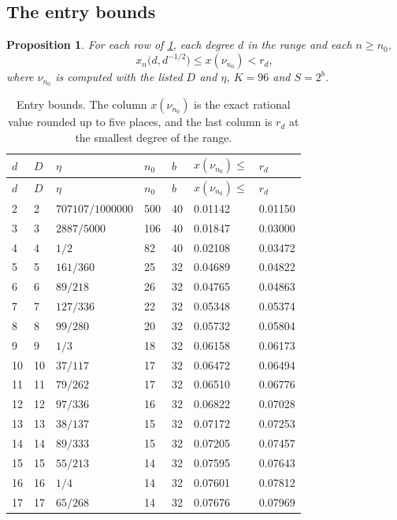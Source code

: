 \documentclass[11pt]{amsart}
\newtheorem{proposition}[theorem]{Proposition}
\theoremstyle{definition}
\theoremstyle{remark}
\begin{document}
\subsection{The entry bounds}

\begin{proposition}\label{prop:entry}
For each row of \cref{tab:entry}, each degree $d$ in the range and each $n\ge n_0$,
\[
x_n\big(d,d^{-1/2}\big)\le x(\nu_{n_0})<r_d,
\]
where $\nu_{n_0}$ is computed with the listed $D$ and $\eta$, $K=96$ and $S=2^b$.
\end{proposition}

{\small
\begin{longtable}{lllllll}
\caption{Entry bounds. The column $x(\nu_{n_0})$ is the exact rational value rounded up to five places, and the
last column is $r_d$ at the smallest degree of the range.}\label{tab:entry}\\
\hline
$d$ & $D$ & $\eta$ & $n_0$ & $b$ & $x(\nu_{n_0})\le$ & $r_d$\\
\hline
\endfirsthead
\hline
$d$ & $D$ & $\eta$ & $n_0$ & $b$ & $x(\nu_{n_0})\le$ & $r_d$\\
\hline
\endhead
2 & 2 & $707107/1000000$ & 500 & 40 & 0.01142 & 0.01150\\
3 & 3 & $2887/5000$ & 106 & 40 & 0.01847 & 0.03000\\
4 & 4 & $1/2$ & 82 & 40 & 0.02108 & 0.03472\\
5 & 5 & $161/360$ & 25 & 32 & 0.04689 & 0.04822\\
6 & 6 & $89/218$ & 26 & 32 & 0.04765 & 0.04863\\
7 & 7 & $127/336$ & 22 & 32 & 0.05348 & 0.05374\\
8 & 8 & $99/280$ & 20 & 32 & 0.05732 & 0.05804\\
9 & 9 & $1/3$ & 18 & 32 & 0.06158 & 0.06173\\
10 & 10 & $37/117$ & 17 & 32 & 0.06472 & 0.06494\\
11 & 11 & $79/262$ & 17 & 32 & 0.06510 & 0.06776\\
12 & 12 & $97/336$ & 16 & 32 & 0.06822 & 0.07028\\
13 & 13 & $38/137$ & 15 & 32 & 0.07172 & 0.07253\\
14 & 14 & $89/333$ & 15 & 32 & 0.07205 & 0.07457\\
15 & 15 & $55/213$ & 14 & 32 & 0.07595 & 0.07643\\
16 & 16 & $1/4$ & 14 & 32 & 0.07601 & 0.07812\\
17 & 17 & $65/268$ & 14 & 32 & 0.07676 & 0.07969\\

\end{longtable}}
\end{document}
